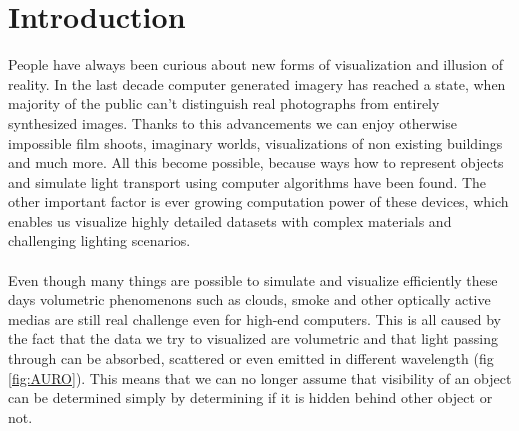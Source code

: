 \chapter{Introduction}
People have always been curious about new forms of visualization and illusion of reality. In the last decade computer generated imagery has reached a state, when majority of the public can't distinguish real photographs from entirely synthesized images. Thanks to this advancements we can enjoy otherwise impossible film shoots, imaginary worlds, visualizations of non existing buildings and much more. All this become possible, because ways how to represent objects and simulate light transport using computer algorithms have been found. The other important factor is ever growing computation power of these devices, which enables us visualize highly detailed datasets with complex materials and challenging lighting scenarios.
\\
\\
Even though many things are possible to simulate and visualize efficiently these days volumetric phenomenons such as clouds, smoke and other optically active medias are still real challenge even for high-end computers. This is all caused by the fact that the data we try to visualized are volumetric and that light passing through can be absorbed, scattered or even emitted in different wavelength (fig \ref{fig:AURO}). This means that we can no longer assume that visibility of an object can be determined simply by determining if it is hidden behind other object or not.
\\
\\
